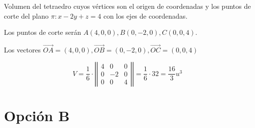 \documentclass[palatino,nosec,nochap,nobuilddate]{Docencia}
\renewcommand{\vec}[1]{\overrightarrow{#1}}
\begin{document}
\begin{problem}

Volumen del tetraedro cuyos vértices son el origen de coordenadas y los puntos de corte del plano $\pi: x-2y+z=4$ con los ejes de coordenadas.

\solution

Los puntos de corte serán $A(4,0,0),B(0,-2,0),C(0,0,4)$.

Los vectores $\vec{OA} = (4,0,0),\vec{OB} = (0,-2,0),\vec{OC} = (0,0,4)$

\[V = \frac{1}{6}·\left|\left|
\begin{matrix}
4&0&0\\
0&-2&0\\
0&0&4
\end{matrix}
\right|\right| = \frac{1}{6}·32 = \frac{16}{3}u^3\]
\end{problem}




\section{Opción B}
\end{document}
